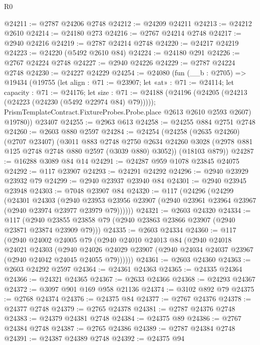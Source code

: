 \begin{lexlean}{R0}
\begin{coremodule}
@24211 := @2787 @24206 @2748
@24212 := @24209 @24211
@24213 := @24212 @2610
@24214 := @24180 @273
@24216 := @2767 @24214 @2748
@24217 := @2940 @24216
@24219 := @2787 @24214 @2748
@24220 := @24217 @24219
@24223 := @24220 (@5492 @2610 @84)
@24224 := @24180 @291
@24226 := @2767 @24224 @2748
@24227 := @2940 @24226
@24229 := @2787 @24224 @2748
@24230 := @24227 @24229
@24254 := @24080
    (fun (__b : @2705) =>
    @19434
      (@19755
        (let align : @71 := @23907;
        let «at» : @71 := @24114;
        let capacity : @71 := @24176;
        let size : @71 := @24188
          (@24196 (@24205 (@24213 (@24223 (@24230 (@5492 @22974 @84) @79)))));
        PrismTemplateContract.FixtureProbes.Probe.place @2613 @2610 @2593 @2607)
        @19780))
    @23407
@24255 := @2963 @613
@24258 := @24255 @884 @2751 @2748
@24260 := @2603 @880 @2597
@24284 := @24254
    (@24258
      (@2635 @24260)
      (@2707 @23407)
      (@3011
        @883
        @2748
        @2750
        @2634
        @24260
        @3028
        (@2978 @881 @125 @2748 @2748 @880 @2597 (@3039 @880) @3052))
      (@18103 @879))
@24287 := @16288 @3089 @84 @14
@24291 := @24287 @959 @1078 @23845 @24075
@24292 := @117 @23907
@24293 := @24291 @24292
@24296 := @2940 @23929 @23932 @79
@24299 := @2940 @23937 @23940 @84
@24301 := @2940 @23945 @23948
@24303 := @7048 @23907 @84
@24320 := @117
    (@24296
      (@24299
        (@24301
          @24303
          (@2940
            @23953
            @23956
            @23907
            (@2940 @23961 @23964 @23967 (@2940 @23974 @23977 @23979 @79))))))
@24321 := @2603 @24320
@24334 := @117
    (@2940 @23855 @23858 @79 (@2940 @23863 @23866 @23907 (@2940 @23871 @23874 @23909 @79)))
@24335 := @2603 @24334
@24360 := @117
    (@2940
      @24002
      @24005
      @79
      (@2940
        @24010
        @24013
        @84
        (@2940
          @24018
          @24021
          @24303
          (@2940
            @24026
            @24029
            @23907
            (@2940 @24034 @24037 @23967 (@2940 @24042 @24045 @24055 @79))))))
@24361 := @2603 @24360
@24363 := @2603 @24292 @2597
@24364 := @24361 @24363
@24365 := @24335 @24364
@24366 := @24321 @24365
@24367 := @2633 @24366
@24368 := @24293 @24367
@24372 := @3097 @901 @169 @958 @21136
@24374 := @3102 @892 @79
@24375 := @2768 @24374
@24376 := @24375 @84
@24377 := @2767 @24376
@24378 := @24377 @2748
@24379 := @2765 @24378
@24381 := @2787 @24376 @2748
@24383 := @24379 @24381 @2748
@24384 := @24375 @89
@24386 := @2767 @24384 @2748
@24387 := @2765 @24386
@24389 := @2787 @24384 @2748
@24391 := @24387 @24389 @2748
@24392 := @24375 @94

\end{coremodule}
\end{lexlean}
